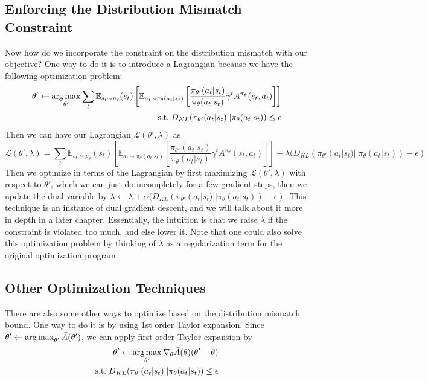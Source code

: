 \subsection{Enforcing the Distribution Mismatch Constraint}
Now how do we incorporate the constraint on the distribution mismatch with our objective? One way to do it is to introduce a Lagrangian because we have the following optimization problem:
\begin{equation}
\begin{aligned}
\theta'\leftarrow \operatorname*{arg\,max}_{\theta'} \sum_t \mathbb{E}_{s_t\sim p_{\theta}}(s_t)\left[\mathbb{E}_{a_t\sim \pi_\theta(a_t|s_t)}\left[\frac{\pi_{\theta'}(a_t|s_t)}{\pi_\theta(a_t|s_t)}\gamma^t A^{\pi_\theta}(s_t,a_t)\right]\right]\\
\mathrm{s.t. }\;D_{KL}(\pi_{\theta'}(a_t|s_t)||\pi_{\theta}(a_t|s_t))\leq \epsilon
    \end{aligned}
\end{equation}
Then we can have our Lagrangian $\mathcal{L}(\theta', \lambda)$ as
$$\mathcal{L}(\theta', \lambda) = \sum_t \mathbb{E}_{s_t\sim p_{\theta}}(s_t)\left[\mathbb{E}_{a_t\sim \pi_\theta(a_t|s_t)}\left[\frac{\pi_{\theta'}(a_t|s_t)}{\pi_\theta(a_t|s_t)}\gamma^t A^{\pi_\theta}(s_t,a_t)\right]\right] - \lambda(D_{KL}(\pi_{\theta'}(a_t|s_t)||\pi_{\theta}(a_t|s_t)) - \epsilon)$$
Then we optimize in terms of the Lagrangian by first maximizing $\mathcal{L}(\theta', \lambda)$ with respect to $\theta'$, which we can just do incompletely for a few gradient steps, then we update the dual variable by $\lambda \leftarrow \lambda + \alpha(D_{KL}(\pi_{\theta'}(a_t|s_t)||\pi_{\theta}(a_t|s_t)) - \epsilon)$. This technique is an instance of dual gradient descent, and we will talk about it more in depth in a later chapter. Essentially, the intuition is that we raise $\lambda$ if the constraint is violated too much, and else lower it. Note that one could also solve this optimization problem by thinking of $\lambda$ as a regularization term for the original optimization program.

\subsection{Other Optimization Techniques}
There are also some other ways to optimize based on the distribution mismatch bound. One way to do it is by using 1st order Taylor expansion. Since $\theta' \leftarrow \operatorname*{arg\,max}_{\theta'}\bar{A}(\theta')$, we can apply first order Taylor expansion by
\begin{equation}
\begin{aligned}
\theta'\leftarrow \operatorname*{arg\,max}_{\theta'} \nabla_{\theta}\bar{A}(\theta)(\theta'-\theta)\\
\mathrm{s.t. }\;D_{KL}(\pi_{\theta'}(a_t|s_t)||\pi_{\theta}(a_t|s_t))\leq \epsilon
    \end{aligned}
\end{equation}

